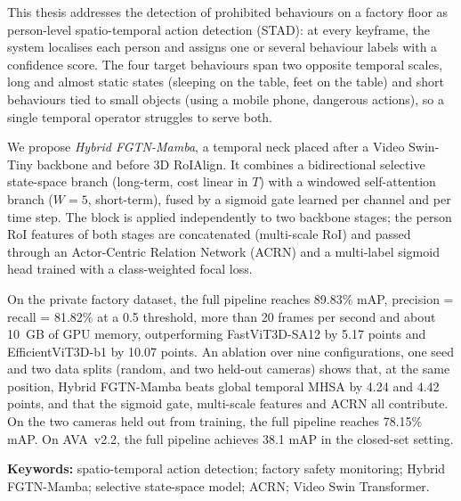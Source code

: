 This thesis addresses the detection of prohibited behaviours on a factory floor as person-level spatio-temporal action detection (STAD): at every keyframe, the system localises each person and assigns one or several behaviour labels with a confidence score. The four target behaviours span two opposite temporal scales, long and almost static states (sleeping on the table, feet on the table) and short behaviours tied to small objects (using a mobile phone, dangerous actions), so a single temporal operator struggles to serve both.

We propose \emph{Hybrid FGTN-Mamba}, a temporal neck placed after a Video Swin-Tiny backbone and before 3D RoIAlign. It combines a bidirectional selective state-space branch (long-term, cost linear in $T$) with a windowed self-attention branch ($W=5$, short-term), fused by a sigmoid gate learned per channel and per time step. The block is applied independently to two backbone stages; the person RoI features of both stages are concatenated (multi-scale RoI) and passed through an Actor-Centric Relation Network (ACRN) and a multi-label sigmoid head trained with a class-weighted focal loss.

On the private factory dataset, the full pipeline reaches 89.83\% mAP, precision = recall = 81.82\% at a 0.5 threshold, more than 20 frames per second and about 10~GB of GPU memory, outperforming FastViT3D-SA12 by 5.17 points and EfficientViT3D-b1 by 10.07 points. An ablation over nine configurations, one seed and two data splits (random, and two held-out cameras) shows that, at the same position, Hybrid FGTN-Mamba beats global temporal MHSA by 4.24 and 4.42 points, and that the sigmoid gate, multi-scale features and ACRN all contribute. On the two cameras held out from training, the full pipeline reaches 78.15\% mAP. On AVA~v2.2, the full pipeline achieves 38.1 mAP in the closed-set setting.

\textbf{Keywords:} spatio-temporal action detection; factory safety monitoring; Hybrid FGTN-Mamba; selective state-space model; ACRN; Video Swin Transformer.
\clearpage

